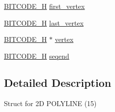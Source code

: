 \begin{DoxyCompactItemize}
\item 
\hyperlink{dwg_8h_a7c700e94e047a97ba8c24bdfe4029dc3}{\-B\-I\-T\-C\-O\-D\-E\-\_\-\-H} \hyperlink{struct__dwg__entity__POLYLINE__2D_aeeee33f48fc4510419f42c93faa719c8}{first\-\_\-vertex}
\item 
\hyperlink{dwg_8h_a7c700e94e047a97ba8c24bdfe4029dc3}{\-B\-I\-T\-C\-O\-D\-E\-\_\-\-H} \hyperlink{struct__dwg__entity__POLYLINE__2D_ac362b5689c1e1217fad1f36f43d64679}{last\-\_\-vertex}
\item 
\hyperlink{dwg_8h_a7c700e94e047a97ba8c24bdfe4029dc3}{\-B\-I\-T\-C\-O\-D\-E\-\_\-\-H} $\ast$ \hyperlink{struct__dwg__entity__POLYLINE__2D_ac6949878c0fe0b53b101ba8ace27363a}{vertex}
\item 
\hyperlink{dwg_8h_a7c700e94e047a97ba8c24bdfe4029dc3}{\-B\-I\-T\-C\-O\-D\-E\-\_\-\-H} \hyperlink{struct__dwg__entity__POLYLINE__2D_a2aee8da8a829d09c0b6f277774fb89a5}{seqend}
\end{DoxyCompactItemize}


\subsection{\-Detailed \-Description}
\-Struct for 2\-D \-P\-O\-L\-Y\-L\-I\-N\-E (15) 

